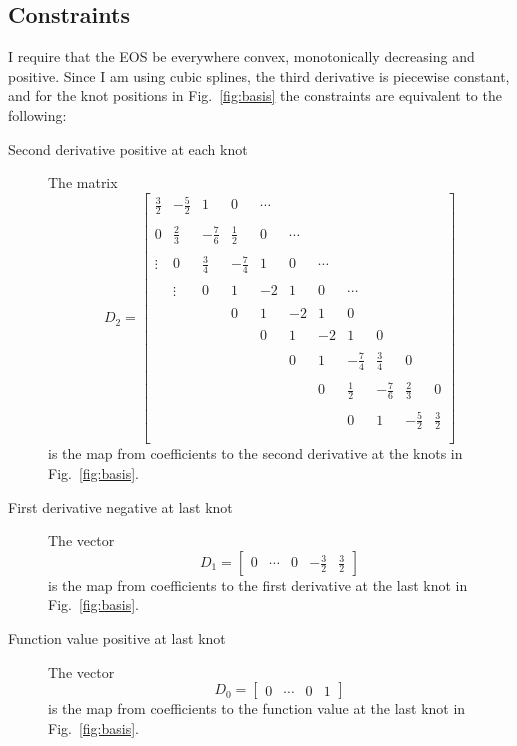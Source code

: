 \documentclass[11pt]{article}
\begin{document}
\subsection{Constraints}
\label{sec:constraints}

I require that the EOS be everywhere convex, monotonically decreasing
and positive.  Since I am using cubic splines, the third derivative is
piecewise constant, and for the knot positions in Fig.~\ref{fig:basis}
the constraints are equivalent to the following:
\begin{description}
\item[Second derivative positive at each knot] The matrix
  \setcounter{MaxMatrixCols}{12}
  \begin{equation}
    \label{eq:d2}
    D_2 =
    \begin{bmatrix}
      \frac{3}{2} & -\frac{5}{2} & 1     & 0   & \cdots \\ \\
      0   & \frac{2}{3} & -\frac{7}{6} & \frac{1}{2} & 0 & \cdots \\ \\
      \vdots   & 0    & \frac{3}{4} & -\frac{7}{4} & 1 & 0 & \cdots \\ \\
      & \vdots    & 0   & 1 & -2 & 1 & 0 & \cdots \\ \\
       & & & 0 & 1 & -2 & 1 & 0  \\ \\
      & & & & 0 & 1 & -2 & 1 & 0  \\ \\
      &&&&& 0 & 1 & -\frac{7}{4} &\frac{3}{4} & 0 \\ \\
      &&&&&& 0 & \frac{1}{2} & -\frac{7}{6} & \frac{2}{3} & 0 \\ \\
      &&&&&&& 0 & 1 & -\frac{5}{2} & \frac{3}{2} \\ \\
    \end{bmatrix}
  \end{equation}
  is the map from coefficients to the second derivative at the knots
  in Fig.~\ref{fig:basis}.
\item[First derivative negative at last knot] The vector
  \begin{equation*}
    D_1 = \begin{bmatrix}
    0 & \cdots & 0 & -\frac{3}{2} & \frac{3}{2}
  \end{bmatrix}
  \end{equation*}
  is the map from coefficients to the first derivative at the last knot
  in Fig.~\ref{fig:basis}.
\item[Function value positive at last knot] The vector
  \begin{equation*}
     D_0 = \begin{bmatrix}
    0 & \cdots & 0 & 1
  \end{bmatrix}
  \end{equation*}
  is the map from coefficients to the function value at the last knot
  in Fig.~\ref{fig:basis}.
\end{description}
\end{document}
